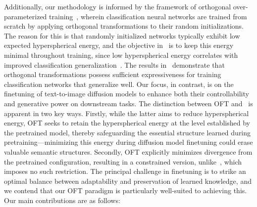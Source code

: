 Additionally, our methodology is informed by the framework of orthogonal over-parameterized training~\cite{liu2021orthogonal}, wherein classification neural networks are trained from scratch by applying orthogonal transformations to their random initializations. The reason for this is that randomly initialized networks typically exhibit low expected hyperspherical energy, and the objective in~\cite{liu2021orthogonal} is to keep this energy minimal throughout training, since low hyperspherical energy correlates with improved classification generalization~\cite{liu2018learning,lin2020regularizing}. The results in~\cite{liu2021orthogonal} demonstrate that orthogonal transformations possess sufficient expressiveness for training classification networks that generalize well. Our focus, in contrast, is on the finetuning of text-to-image diffusion models to enhance both their controllability and generative power on downstream tasks. The distinction between OFT and~\cite{liu2021orthogonal} is apparent in two key ways. Firstly, while the latter aims to reduce hyperspherical energy, OFT seeks to retain the hyperspherical energy at the level established by the pretrained model, thereby safeguarding the essential structure learned during pretraining—minimizing this energy during diffusion model finetuning could erase valuable semantic structures. Secondly, OFT explicitly minimizes divergence from the pretrained configuration, resulting in a constrained version, unlike~\cite{liu2021orthogonal}, which imposes no such restriction. The principal challenge in finetuning is to strike an optimal balance between adaptability and preservation of learned knowledge, and we contend that our OFT paradigm is particularly well-suited to achieving this. Our main contributions are as follows:

